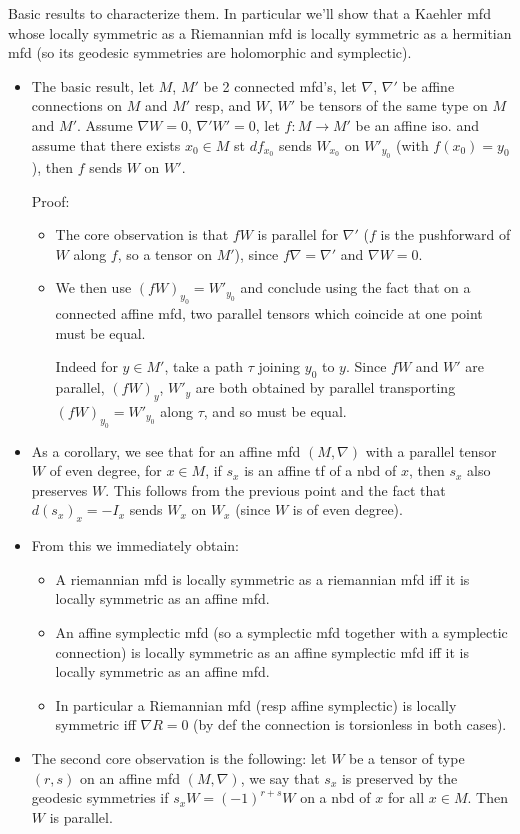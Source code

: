 \documentclass{report}
\theoremstyle{definition}
\begin{document}
Basic results to characterize them. In particular we'll show that a Kaehler mfd whose locally symmetric as a Riemannian mfd is locally symmetric as a hermitian mfd (so its geodesic symmetries are holomorphic and symplectic).
\begin{itemize}
    \item The basic result, let $M$, $M'$ be 2 connected mfd's, let $\nabla$, $\nabla'$ be affine connections on $M$ and $M'$ resp, and $W$, $W'$ be tensors of the same type on $M$ and $M'$. Assume $\nabla W=0$, $\nabla' W'=0$, let $f:M\to M'$ be an affine iso. and assume that there exists $x_0\in M$ st $df_{x_0}$ sends $W_{x_0}$ on $W'_{y_0}$ (with $f(x_0)=y_0$), then $f$ sends $W$ on $W'$.

    Proof:
    \begin{itemize}
        \item The core observation is that $fW$ is parallel for $\nabla'$ ($f$ is the pushforward of $W$ along $f$, so a tensor on $M'$), since $f\nabla=\nabla'$ and $\nabla W=0$.
        \item We then use $(fW)_{y_0}=W'_{y_0}$ and conclude using the fact that on a connected affine mfd, two parallel tensors which coincide at one point must be equal.

        Indeed for $y\in M'$, take a path $\tau$ joining $y_0$ to $y$. Since $fW$ and $W'$ are parallel, $(fW)_y$, $W'_y$ are both obtained by parallel transporting $(fW)_{y_0}=W'_{y_0}$ along $\tau$, and so must be equal.
    \end{itemize}
    \item As a corollary, we see that for an affine mfd $(M,\nabla)$ with a parallel tensor $W$ of even degree, for $x\in M$, if $s_x$ is an affine tf of a nbd of $x$, then $s_x$ also preserves $W$. This follows from the previous point and the fact that $d(s_x)_x=-I_x$ sends $W_x$ on $W_x$ (since $W$ is of even degree).
    \item From this we immediately obtain:
    \begin{itemize}
        \item A riemannian mfd is locally symmetric as a riemannian mfd iff it is locally symmetric as an affine mfd.
        \item An affine symplectic mfd (so a symplectic mfd together with a symplectic connection) is locally symmetric as an affine symplectic mfd iff it is locally symmetric as an affine mfd.
        \item In particular a Riemannian mfd (resp affine symplectic) is locally symmetric iff $\nabla R=0$ (by def the connection is torsionless in both cases).
    \end{itemize}
    \item The second core observation is the following: let $W$ be a tensor of type $(r,s)$ on an affine mfd $(M,\nabla)$, we say that $s_x$ is preserved by the geodesic symmetries if $s_xW=(-1)^{r+s}W$ on a nbd of $x$ for all $x\in M$. Then $W$ is parallel.


\end{itemize}
\end{document}
